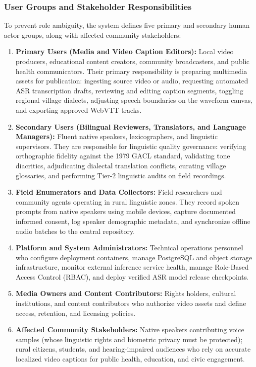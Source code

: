 \documentclass[a4paper,11pt]{article}
\begin{document}
\subsubsection{User Groups and Stakeholder Responsibilities}
\label{sec:chap3_ucd_users}
To prevent role ambiguity, the system defines five primary and secondary human actor groups, along with affected community stakeholders:
\begin{enumerate}
    \item \textbf{Primary Users (Media and Video Caption Editors):} Local video producers, educational content creators, community broadcasters, and public health communicators. Their primary responsibility is preparing multimedia assets for publication: ingesting source video or audio, requesting automated ASR transcription drafts, reviewing and editing caption segments, toggling regional village dialects, adjusting speech boundaries on the waveform canvas, and exporting approved WebVTT tracks.
    \item \textbf{Secondary Users (Bilingual Reviewers, Translators, and Language Managers):} Fluent native speakers, lexicographers, and linguistic supervisors. They are responsible for linguistic quality governance: verifying orthographic fidelity against the 1979 GACL standard, validating tone diacritics, adjudicating dialectal translation conflicts, curating village glossaries, and performing Tier-2 linguistic audits on field recordings.
    \item \textbf{Field Enumerators and Data Collectors:} Field researchers and community agents operating in rural linguistic zones. They record spoken prompts from native speakers using mobile devices, capture documented informed consent, log speaker demographic metadata, and synchronize offline audio batches to the central repository.
    \item \textbf{Platform and System Administrators:} Technical operations personnel who configure deployment containers, manage PostgreSQL and object storage infrastructure, monitor external inference service health, manage Role-Based Access Control (RBAC), and deploy verified ASR model release checkpoints.
    \item \textbf{Media Owners and Content Contributors:} Rights holders, cultural institutions, and content contributors who authorize video assets and define access, retention, and licensing policies.
    \item \textbf{Affected Community Stakeholders:} Native speakers contributing voice samples (whose linguistic rights and biometric privacy must be protected); rural citizens, students, and hearing-impaired audiences who rely on accurate localized video captions for public health, education, and civic engagement.
\end{enumerate}
\end{document}
